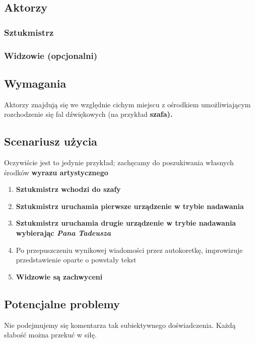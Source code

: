 \documentclass{article}
\begin{document}
\subsection{Aktorzy}
\subsubsection{Sztukmistrz}
\subsubsection{Widzowie (opcjonalni)}
\subsection{Wymagania}
Aktorzy znajdują się we względnie cichym miejscu z ośrodkiem umożliwiającym rozchodzenie się fal dźwiękowych (na przykład \bf{szafa}).

\subsection{Scenariusz użycia}
\normalfont
Oczywiście jest to jedynie przykład; zachęcamy do poszukiwania własnych środków \bf wyrazu artystycznego
\begin{enumerate}
	\normalfont \item \bf Sztukmistrz \normalfont wchodzi do \bf szafy \normalfont
	\item \bf Sztukmistrz \normalfont uruchamia pierwsze urządzenie w trybie nadawania
	\item \bf Sztukmistrz \normalfont uruchamia drugie urządzenie w trybie nadawania wybierając \it Pana Tadeusza \normalfont
	\item Po przepuszczeniu wynikowej wiadomości przez autokoretkę, improwizuje przedstawienie oparte o powstały tekst
	\item \bf Widzowie \normalfont są \bf zachwyceni \normalfont
\end{enumerate}

\subsection{Potencjalne problemy}
\normalfont
Nie podejmujemy się komentarza tak subiektywnego doświadczenia. Każdą słabość można przekuć w siłę.
\end{document}
